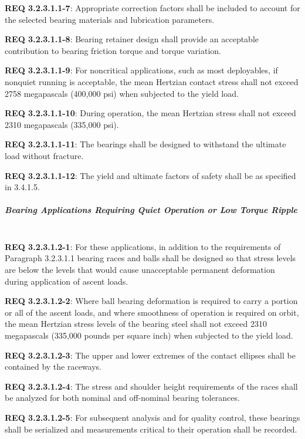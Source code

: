 \documentclass[12pt]{article}
\begin{document}
\noindent \textbf{REQ 3.2.3.1.1-7}: Appropriate correction factors shall be included to account for the selected bearing materials and lubrication parameters. 

\noindent \textbf{REQ 3.2.3.1.1-8}: Bearing retainer design shall provide an acceptable contribution to bearing friction torque and torque variation. 

\noindent \textbf{REQ 3.2.3.1.1-9}: For noncritical applications, such as most deployables, if nonquiet running is acceptable, the mean Hertzian contact stress shall not exceed 2758 megapascals (400,000 psi) when subjected to the yield load. 

\noindent \textbf{REQ 3.2.3.1.1-10}: During operation, the mean Hertzian stress shall not exceed 2310 megapascals (335,000 psi).

\noindent \textbf{REQ 3.2.3.1.1-11}: The bearings shall be designed to withstand the ultimate load without fracture. 

\noindent \textbf{REQ 3.2.3.1.1-12}: The yield and ultimate factors of safety shall be as specified in 3.4.1.5.


\subparagraph{Bearing Applications Requiring Quiet Operation or Low Torque Ripple} \mbox{} \\ %
\noindent \textbf{REQ 3.2.3.1.2-1}: For these applications, in addition to the requirements of Paragraph 3.2.3.1.1 bearing races and balls shall be designed so that stress levels are below the levels that would cause unacceptable permanent deformation during application of ascent loads.
 
\noindent \textbf{REQ 3.2.3.1.2-2}: Where ball bearing deformation is required to carry a portion or all of the ascent loads, and where smoothness of operation is required on orbit, the mean Hertzian stress levels of the bearing steel shall not exceed 2310 megapascals (335,000 pounds per square inch) when subjected to the yield load.
 
\noindent \textbf{REQ 3.2.3.1.2-3}: The upper and lower extremes of the contact ellipses shall be contained by the raceways. 

\noindent \textbf{REQ 3.2.3.1.2-4}: The stress and shoulder height requirements of the races shall be analyzed for both nominal and off-nominal bearing tolerances.

\noindent \textbf{REQ 3.2.3.1.2-5}: For subsequent analysis and for quality control, these bearings shall be serialized and measurements critical to their operation shall be recorded. 
\end{document}
